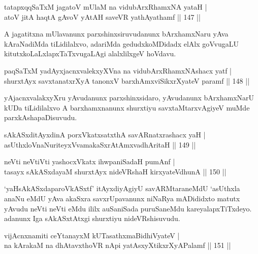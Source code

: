 \begin{shl}
tatapxqqSaTxM jagatoV mUlaM na vidubArxRhamxNA yataH |\\
atoV jitA haqtA gAvoV yAtAH saveVR yathAyathamf \hfill || 147 ||
\end{shl}

\begin{artha}
A jagatitxna mUlavanunx parxshinxsiruvudanunx bArxhamxNaru yAva kAraNadiMda tiLidilalxvo, adariMda gedudxkoMDidadx elAlx goVvugaLU kitutxkoLaLxlapxTaTxvugaLAgi alalxlilxgeV hoVdavu.
\end{artha}

\begin{shl}
paqSaTxM yadAyxjacnxvalekxyXVna na vidubArxRhamxNAshacx yatf |\\
shurxtAyx savxtanatxrXyA tanonxV barxhAmx\s \s viSikxrXyateV paramf \hfill || 148 ||
\end{shl}

\begin{artha}%
yAjacnxvalakxyXru yAvudanunx parxshinxsidaro, yAvudanunx bArxhamxNarU kUDa tiLidilalxvo A barxhamxnanunx shurxtiyu savxtaMtarxvAgiyeV muMde parxkAshapaDisuvudu.
\end{artha}

\begin{shl}
sAkASxditAyxdinA porxVkatxsatxthA savARnatxrashacx yaH |\\
asUthxloV\s naNuriteyxVvamakaSxrAtAmx\s vadhAritaH \hfill || 149 ||
\end{shl}

\begin{shl}
neVti neVtiVti yashocxVkatx ihwpaniSadaH pumAnf |\\
tasayx sAkASxdayaM shurxtAyx nideVRshaH kirxyateV\s dhunA \hfill || 150 ||
\end{shl}

\begin{artha}
`yaHsAkASxdaparoVkASxtf' itAyxdiyAgiyU savARMtaraneMdU `asUthxla anaNu eMdU yAva akaSxra savxrUpavanunx niNaRya mADididxto matutx yAvudu neVti neVti eMdu ililx auSaniSada puruSaneMdu kareyalapxTiTxdeyo. adanunx Iga sAkASxtAtxgi shurxtiyu nideVRshisuvudu.
\end{artha}

\begin{shl}
vijAcnxnamiti ceYtanayxM kUTasathxmaBidhiVyateV |\\
na kArakaM na dhAtavxthoVR nApi yatAsxyXtikxrXyAPalamf \hfill || 151 ||
\end{shl}

